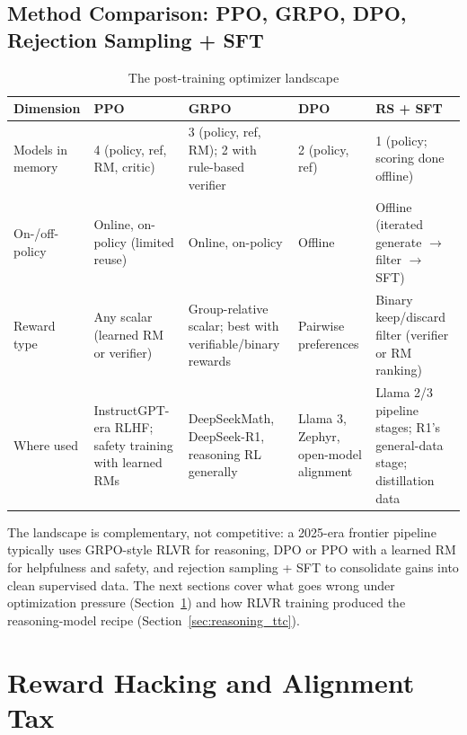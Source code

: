 \subsection{Method Comparison: PPO, GRPO, DPO, Rejection Sampling + SFT}

\begin{table}[H]
\centering
\small
\caption{The post-training optimizer landscape}
\label{tab:posttrain_comparison}
\begin{tabularx}{\textwidth}{lXXXX}
\toprule
\textbf{Dimension} & \textbf{PPO} & \textbf{GRPO} & \textbf{DPO} & \textbf{RS + SFT} \\
\midrule
Models in memory & 4 (policy, ref, RM, critic) & 3 (policy, ref, RM); 2 with rule-based verifier & 2 (policy, ref) & 1 (policy; scoring done offline) \\
On-/off-policy & Online, on-policy (limited reuse) & Online, on-policy & Offline & Offline (iterated generate $\rightarrow$ filter $\rightarrow$ SFT) \\
Reward type & Any scalar (learned RM or verifier) & Group-relative scalar; best with verifiable/binary rewards & Pairwise preferences & Binary keep/discard filter (verifier or RM ranking) \\
Where used & InstructGPT-era RLHF; safety training with learned RMs & DeepSeekMath, DeepSeek-R1, reasoning RL generally & Llama 3, Zephyr, open-model alignment & Llama 2/3 pipeline stages; R1's general-data stage; distillation data \\
\bottomrule
\end{tabularx}
\end{table}

The landscape is complementary, not competitive: a 2025-era frontier pipeline typically uses GRPO-style RLVR for reasoning, DPO or PPO with a learned RM for helpfulness and safety, and rejection sampling + SFT to consolidate gains into clean supervised data. The next sections cover what goes wrong under optimization pressure (Section~\ref{sec:reward_hacking}) and how RLVR training produced the reasoning-model recipe (Section~\ref{sec:reasoning_ttc}).

\section{Reward Hacking and Alignment Tax}
\label{sec:reward_hacking}

